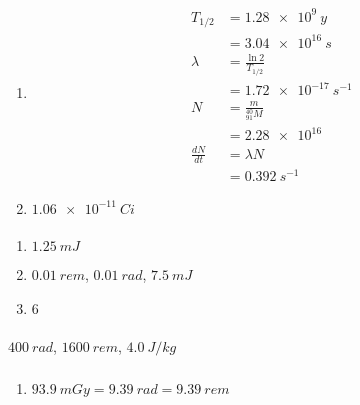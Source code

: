 \documentclass{article}
\begin{document}
\begin{enumerate}
  \item

        \begin{align*}
          T_{1 / 2}       & = \qty{1.28e9}{y}         \\
                          & = \qty{3.04e16}{s}        \\
          \lambda         & = \frac{\ln 2}{T_{1 / 2}} \\
                          & = \qty{1.72e-17}{s^{-1}}  \\
          N               & = \frac{m}{^{40}_{91} M}  \\
                          & = \num{2.28e16}           \\
          \frac{d N}{d t} & = \lambda N               \\
                          & = \qty{0.392}{s^{-1}}
        \end{align*}

  \item $\qty{1.06e-11}{Ci}$
\end{enumerate}

\setcounter{subsubsection}{30}
\subsubsection{}

\begin{enumerate}
  \item $\qty{1.25}{mJ}$

  \item $\qty{0.01}{rem}$, $\qty{0.01}{rad}$, $\qty{7.5}{mJ}$

  \item $6$
\end{enumerate}

\setcounter{subsubsection}{32}
\subsubsection{}

$\qty{400}{rad}$, $\qty{1600}{rem}$, $\qty{4.0}{J/kg}$

\setcounter{subsubsection}{36}
\subsubsection{}

\begin{enumerate}
  \item $\qty{93.9}{mGy} = \qty{9.39}{rad} = \qty{9.39}{rem}$
\end{enumerate}
\end{document}
